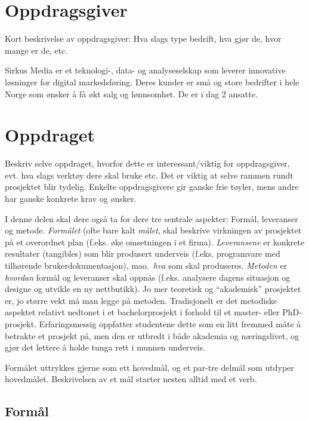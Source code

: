 \documentclass[11pt,a4paper]{report}
\begin{document}
\section*{Oppdragsgiver}

Kort beskrivelse av oppdragsgiver: Hva slags type bedrift, hva gjør de, hvor mange er de, etc.

Sirkus Media er et teknologi-, data- og analyseselskap som leverer innovative løsninger for digital markedsføring. Deres kunder er små og store bedrifter i hele Norge som ønsker å få økt salg og lønnsomhet. De er i dag 2 ansatte. 

\lipsum[3-4]

\section*{Oppdraget}

Beskriv selve oppdraget, hvorfor dette er interessant/viktig for oppdragsgiver, evt. hva slags verktøy dere skal bruke etc. Det er viktig at selve rammen rundt prosjektet blir tydelig. Enkelte oppdragsgivere gir ganske frie tøyler, mens andre har ganske konkrete krav og ønsker.

I denne delen skal dere også ta for dere  tre sentrale aspekter: Formål, leveranser og metode. {\em Formålet} (ofte bare kalt {\em målet}, skal beskrive virkningen av prosjektet på et overordnet plan (f.eks. øke omsetningen i et firma). 
{\em Leveransene} er konkrete resultater (tangibles) som blir produsert underveis (f.eks. programvare med tilhørende brukerdokumentasjon), mao.\ {\em hva} som skal produseres. 
{\em Metoden} er {\em hvordan} formål og leveranser skal oppnås (f.eks. analysere dagens situasjon og designe og utvikle en ny nettbutikk). 
Jo mer teoretisk og ``akademisk'' prosjektet er, jo større vekt må man legge på metoden. Tradisjonelt er det metodiske aspektet relativt nedtonet i et bachelorprosjekt i forhold til et master- eller PhD-prosjekt.
Erfaringsmessig oppfatter studentene dette som en litt fremmed måte å betrakte et prosjekt på, men den er utbredt i både akademia og næringslivet, og gjør det lettere å holde tunga rett i munnen underveis. 

Formålet uttrykkes gjerne som ett hovedmål, og et par-tre delmål som utdyper hovedmålet. Beskrivelsen av et mål starter nesten alltid med et verb.


\subsection*{Formål}
\end{document}

